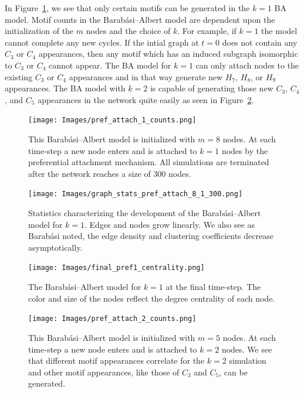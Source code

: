In Figure~\ref{fig:BA1}, we see that only certain motifs can be generated in the $k=1$ BA model.
Motif counts in the Barabási–Albert model are dependent upon the initialization of the $m$ nodes 
and the choice of $k$. For example, if $k=1$ the model cannot complete any new cycles. If the
intial graph at $t=0$ does not contain any $C_3$ or $C_4$ appearances, then any motif 
which has an induced subgraph isomorphic to $C_3$ or $C_4$ cannot appear. The BA model 
for $k=1$ can only attach nodes to the existing  $C_3$ or $C_4$ appearances and in that 
way generate new $H_{7}$, $H_{8}$, or $H_{9}$ appearances. The BA model with $k=2$ is capable of generating those
 new $C_3$, $C_4$, and $C_5$ appearances in the network quite easily as seen in Figure~\ref{fig:BA2}.

\begin{figure}[h!]
    \texttt{[image: Images/pref\_attach\_1\_counts.png]}
    \centering
    \caption{This Barabási–Albert model is initialized with $m=8$ nodes.
    At each time-step a new node enters and is attached to $k=1$ nodes by the preferential attachment mechanism.
      All simulations are terminated after the network reaches a size of $300$ nodes.}
    \label{fig:BA1}
\end{figure}


\begin{figure}[h!]
    \texttt{[image: Images/graph\_stats\_pref\_attach\_8\_1\_300.png]}
    \centering
    \caption{Statistics characterizing the development of the Barabási–Albert model for $k=1$.
    Edges and nodes grow linearly. We also see as Barabási noted, the edge density and clustering coefficients decrease asymptotically.}
\end{figure}


\begin{figure}
    \texttt{[image: Images/final\_pref1\_centrality.png]}
    \centering
    \caption{The Barabási–Albert model for $k=1$ at the final time-step. The color and size of the nodes reflect
            the degree centrality of each node.}
\end{figure}

\begin{figure}[h!]
    \texttt{[image: Images/pref\_attach\_2\_counts.png]}
    \centering
    \caption{This Barabási–Albert model is initialized with $m=5$ nodes.
    At each time-step a new node enters and is attached to $k=2$ nodes. We see that different motif appearances
    correlate for the $k=2$ simulation and other motif appearances, like those of $C_3$ and $C_5$, can be generated.}
    \label{fig:BA2}
\end{figure}


